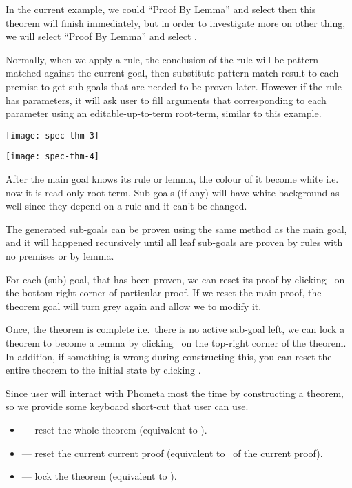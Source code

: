 \documentclass[master.tex]{subfiles}
\begin{document}
In the current example, we could ``Proof By Lemma'' and select 
then this theorem will finish immediately, but in order to investigate more on
other thing, we will select ``Proof By Lemma'' and select .

Normally, when we apply a rule, the conclusion of the rule will be pattern
matched against the current goal, then substitute pattern match result to each
premise to get sub-goals that are needed to be proven later. However if the rule
has parameters, it will ask user to fill arguments that corresponding to each
parameter using an editable-up-to-term root-term, similar to this example.

\begin{center}
\texttt{[image: spec-thm-3]}
\end{center}
\begin{center}
\texttt{[image: spec-thm-4]}
\end{center}

After the main goal knows its rule or lemma, the colour of it become white i.e.
now it is read-only root-term. Sub-goals (if any) will have white background as
well since they depend on a rule and it can't be changed.

The generated sub-goals can be proven using the same method as the main goal,
and it will happened recursively until all leaf sub-goals are proven by rules
with no premises or by lemma.

For each (sub) goal, that has been proven, we can reset its proof by clicking
\closeButton\ on the bottom-right corner of particular proof. If we reset the
main proof, the theorem goal will turn grey again and allow we to modify it.

Once, the theorem is complete i.e.\ there is no active sub-goal left, we can
lock a theorem to become a lemma by clicking \lockButton\ on the top-right
corner of the theorem. In addition, if something is wrong during constructing
this, you can reset the entire theorem to the initial state by clicking
\resetButton.

Since user will interact with Phometa most the time by constructing a theorem,
so we provide some keyboard short-cut that user can use.

\begin{itemize}
\item {} --- reset the whole theorem (equivalent to \resetButton).
\item {} --- reset the current current proof (equivalent to \closeButton\
  of the current proof).
\item {} --- lock the theorem (equivalent to \lockButton).
\end{itemize}
\end{document}
